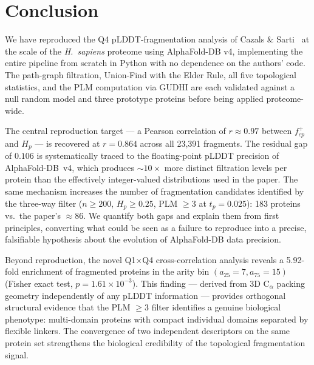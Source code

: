 \section{Conclusion}
\label{sec:conclusion}

We have reproduced the Q4 pLDDT-fragmentation analysis of Cazals \&
Sarti~\cite{cazals2025alphafold} at the scale of the \textit{H.~sapiens}
proteome using AlphaFold-DB v4, implementing the entire pipeline from
scratch in Python with no dependence on the authors' code.
The path-graph filtration, Union-Find with the Elder Rule, all five
topological statistics, and the PLM computation via GUDHI are each
validated against a null random model and three prototype proteins before
being applied proteome-wide.

The central reproduction target --- a Pearson correlation of $r \approx
0.97$ between $f^+_{cp}$ and $H_p$ --- is recovered at $r = 0.864$
across all 23{,}391 fragments.
The residual gap of $0.106$ is systematically traced to the
floating-point pLDDT precision of AlphaFold-DB~v4, which produces
$\sim\!10\times$ more distinct filtration levels per protein than the
effectively integer-valued distributions used in the paper.
The same mechanism increases the number of fragmentation candidates
identified by the three-way filter ($n \geq 200$, $H_p \geq 0.25$,
PLM $\geq 3$ at $t_p = 0.025$): 183 proteins vs.\ the paper's
$\approx 86$.
We quantify both gaps and explain them from first principles, converting
what could be seen as a failure to reproduce into a precise, falsifiable
hypothesis about the evolution of AlphaFold-DB data precision.

Beyond reproduction, the novel Q1$\times$Q4 cross-correlation analysis
reveals a 5.92-fold enrichment of fragmented proteins in the arity bin
$(a_{25}=7, a_{75}=15)$ (Fisher exact test, $p = 1.61 \times 10^{-3}$).
This finding --- derived from 3D $\mathrm{C}_\alpha$ packing geometry
independently of any pLDDT information --- provides orthogonal structural
evidence that the PLM $\geq 3$ filter identifies a genuine biological
phenotype: multi-domain proteins with compact individual domains separated
by flexible linkers.
The convergence of two independent descriptors on the same protein set
strengthens the biological credibility of the topological fragmentation
signal.

